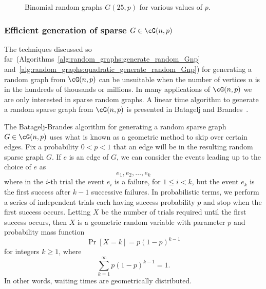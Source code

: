 \begin{figure}[!htbp]
\centering
{}

\caption{Binomial random graphs $G(25,p)$ for various values of $p$.}
\label{fig:random_graphs:binomial_random_graph_25_nodes}
\end{figure}



\subsubsection{Efficient generation of sparse $G \in \cG(n,p)$}

The techniques discussed so
far~(Algorithms~\ref{alg:random_graphs:generate_random_Gnp}
and~\ref{alg:random_graphs:quadratic_generate_random_Gnp}) for
generating a random graph from $\cG(n,p)$ can be unsuitable when the
number of vertices $n$ is in the hundreds of thousands or millions. In
many applications of $\cG(n,p)$ we are only interested in
sparse random graphs. A linear time algorithm to
generate a random sparse graph from $\cG(n,p)$ is presented in
Batagelj and
Brandes~\cite{BatageljBrandes2005}.

The Batagelj-Brandes algorithm for
generating a random sparse graph $G \in \cG(n,p)$ uses what is known as
a geometric method to skip over certain edges. Fix a probability
$0 < p < 1$ that an edge will be in the resulting random sparse graph
$G$. If $e$ is an edge of $G$, we can consider the events leading up
to the choice of $e$ as
\[
e_1, e_2, \dots, e_k
\]
where in the $i$-th trial the event $e_i$ is a failure, for
$1 \leq i < k$, but the event $e_k$ is the first success after
$k - 1$ successive failures. In probabilistic terms, we perform a
series of independent trials each having success probability $p$ and
stop when the first success occurs. Letting $X$ be the number of
trials required until the first success occurs, then $X$ is a
geometric random variable with parameter $p$ and probability mass
function
\begin{equation}
\label{eqn:random_graphs:probability_mass_function_geometric_distribution}
\Pr[X = k]
=
p (1 - p)^{k - 1}
\end{equation}
for integers $k \geq 1$, where
\[
\sum_{k=1}^\infty p (1 - p)^{k - 1}
=
1.
\]
In other words, waiting times are
geometrically distributed.

